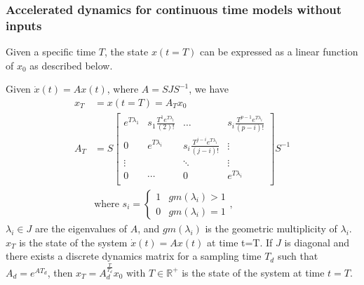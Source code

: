 \documentclass[a4paper,UKenglish]{lipics-v2018}
\newcommand{\mat}[1]{{#1}}
\renewcommand{\vec}[1]{{#1}}
\begin{document}
 \subsubsection{Accelerated dynamics for continuous time models without inputs}\label{sec:cont_acc_no_inputs}
 Given a specific time $T$, the state $\vec{x}(t=T)$ can be expressed as a linear function of $\vec{x}_0$ as described below.
 
 \begin{lemma}
 Given $\dot{\vec{x}}(t)=\mat{A}\vec{x}(t)$, where $\mat{A}=\mat{S}\mat{J}\mat{S}^{-1}$, we have
 \begin{align}
 \vec{x}_T&=\vec{x}(t=T)=\mat{A}_{T}\vec{x}_0\\
 \mat{A}_{T}&= \mat{S}
 \left [ \begin{array}{cccc}
 e^{T\lambda_1}  & s_1\frac{T^{1}e^{T\lambda_i}}{(2)!} & \hdots  & s_i\frac{T^{p-1}e^{T\lambda_i}}{(p-i)!} \\
0 & e^{T\lambda_i}  & s_i\frac{T^{j-i}e^{T\lambda_i}}{(j-i)!} & \vdots \\
\vdots & & \ddots & \vdots \\
0 & \cdots & 0  &e^{T\lambda_i} \\
\end{array} \right ]
 \mat{S}^{-1}
 \label{eq:continuous_tube_dyn}\\
 &\text{where } s_i=\left\{\begin{array}{cc}1&gm(\lambda_i)>1\\0&gm(\lambda_i)=1\end{array}\right.,\nonumber
 \end{align}
$\lambda_i \in \mat{J}$ are the eigenvalues of $\mat{A}$, and $gm(\lambda_i)$ is the geometric multiplicity of $\lambda_i$.  
$\vec{x}_T$ is the state of the system $\dot{\vec{x}}(t)=\mat{A}\vec{x}(t)$ at time t=T.
  If $\mat{J}$ is diagonal and there exists a discrete dynamics matrix for a sampling time $T_d$ such that $A_d=e^{\mat{A} T_d}$, then $\vec{x}_T=A_d^{\frac{T}{T_d}}\vec{x}_0 \text{ with } T \in \mathbb{R}^+$ is the state of the system at time $t=T$.
 \end{lemma}
\end{document}
